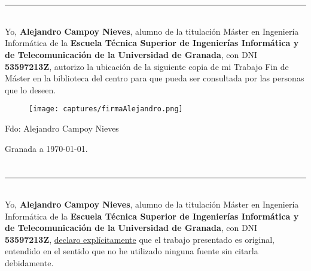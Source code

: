 \documentclass[11pt,fleqn]{book} %
\begin{document}

\section*{}
\thispagestyle{empty}

\noindent\rule[-1ex]{\textwidth}{2pt}\\[4.5ex]

Yo, \textbf{Alejandro Campoy Nieves}, alumno de la titulación Máster en Ingeniería Informática de la \textbf{Escuela Técnica Superior de Ingenierías Informática y de Telecomunicación de la Universidad de Granada}, con DNI \textbf{53597213Z}, autorizo la ubicación de la siguiente copia de mi Trabajo Fin de Máster en la biblioteca del centro para que pueda ser consultada por las personas que lo deseen.

\vspace{3cm}

\begin{figure}[H]
	\texttt{[image: captures/firmaAlejandro.png]}
\end{figure}

\noindent Fdo: Alejandro Campoy Nieves

\vspace{2cm}

\begin{flushright}
	Granada a \today .
\end{flushright}

\newpage

\section*{}
\thispagestyle{empty}

\noindent\rule[-1ex]{\textwidth}{2pt}\\[4.5ex]

Yo, \textbf{Alejandro Campoy Nieves}, alumno de la titulación Máster en Ingeniería Informática de la \textbf{Escuela Técnica Superior de Ingenierías Informática y de Telecomunicación de la Universidad de Granada}, con DNI \textbf{53597213Z}, \underline{declaro explícitamente} que el trabajo presentado
es original, entendido en el sentido que no he utilizado ninguna fuente sin
citarla debidamente.
\end{document}
